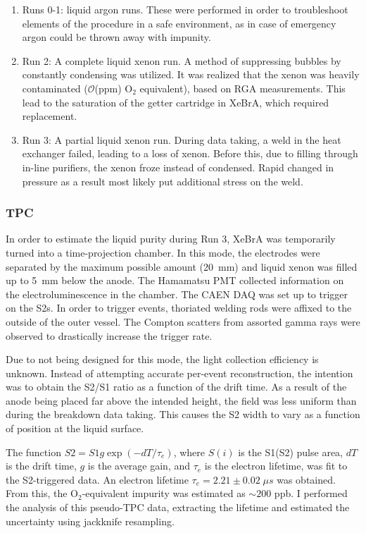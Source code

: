 \begin{enumerate}
    \item Runs 0-1: liquid argon runs. 
    These were performed in order to troubleshoot elements of the procedure in a safe  environment, as in case of emergency argon could be thrown away with impunity.
    \item Run 2: A complete liquid xenon run. 
    A method of suppressing bubbles by constantly condensing was utilized.
    It was realized that the xenon was heavily contaminated ($\mathcal{O}$(ppm) O$_2$ equivalent), based on RGA measurements. 
    This lead to the saturation of the getter cartridge in XeBrA, which required replacement.
    \item Run 3: A partial liquid xenon run. During data taking, a weld in the heat exchanger failed, leading to a loss of xenon. Before this, due to filling through in-line purifiers, the xenon froze instead of condensed. Rapid changed in pressure as a result most likely put additional stress on the weld.
\end{enumerate}
\subsubsection{TPC}
In order to estimate the liquid purity during Run 3, XeBrA was temporarily turned into a time-projection chamber. 
In this mode, the electrodes were separated by the maximum possible amount (20~mm) and liquid xenon was filled up to 5~mm below the anode.
The Hamamatsu PMT collected information on the electroluminescence in the chamber.
The CAEN DAQ was set up to trigger on the S2s.
In order to trigger events, thoriated welding rods were affixed to the outside of the outer vessel.
The Compton scatters from assorted gamma rays were observed to drastically increase the trigger rate.

Due to not being designed for this mode, the light collection efficiency is unknown. 
Instead of attempting accurate per-event reconstruction, the intention was to obtain the S2/S1 ratio as a function of the drift time.
As a result of the anode being placed far above the intended height, the field was less uniform than during the breakdown data taking.
This causes the S2 width to vary as a function of position at the liquid surface.

The function $S2 = S1 g \exp(-dT/\tau_e)$, where $S(i)$ is the S1(S2) pulse area, $dT$ is the drift time, $g$ is the average gain, and $\tau_e$ is the electron lifetime, was fit to the S2-triggered data.
An electron lifetime $\tau_e=2.21 \pm 0.02\;\mu s$ was obtained.
From this, the O$_2$-equivalent impurity was estimated as $\sim 200$ ppb. 
I performed the analysis of this pseudo-TPC data, extracting the lifetime and estimated the uncertainty using jackknife resampling.

